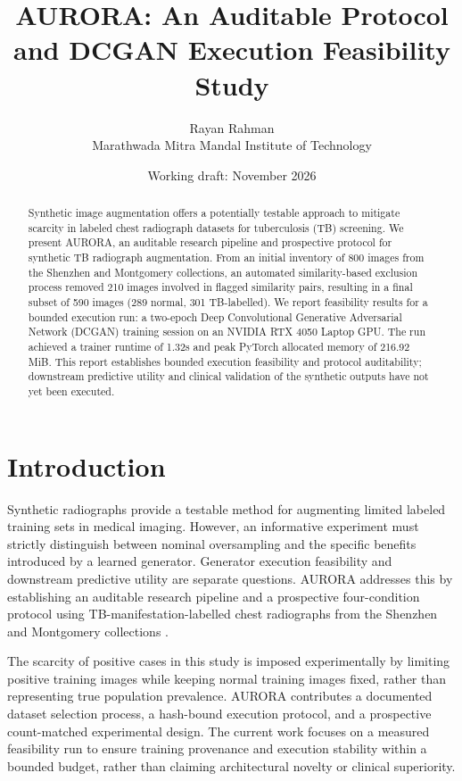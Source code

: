 \documentclass[11pt]{article}
\title{AURORA: An Auditable Protocol and DCGAN Execution Feasibility Study}
\author{Rayan Rahman\\Marathwada Mitra Mandal Institute of Technology}
\date{Working draft: November 2026}
\begin{document}
\maketitle

\begin{abstract}
Synthetic image augmentation offers a potentially testable approach to mitigate scarcity in labeled chest radiograph datasets for tuberculosis (TB) screening. We present AURORA, an auditable research pipeline and prospective protocol for synthetic TB radiograph augmentation. From an initial inventory of 800 images from the Shenzhen and Montgomery collections, an automated similarity-based exclusion process removed 210 images involved in flagged similarity pairs, resulting in a final subset of 590 images (289 normal, 301 TB-labelled). We report feasibility results for a bounded execution run: a two-epoch Deep Convolutional Generative Adversarial Network (DCGAN) training session on an NVIDIA RTX 4050 Laptop GPU. The run achieved a trainer runtime of 1.32s and peak PyTorch allocated memory of 216.92 MiB. This report establishes bounded execution feasibility and protocol auditability; downstream predictive utility and clinical validation of the synthetic outputs have not yet been executed.
\end{abstract}

\section{Introduction}
Synthetic radiographs provide a testable method for augmenting limited labeled training sets in medical imaging. However, an informative experiment must strictly distinguish between nominal oversampling and the specific benefits introduced by a learned generator. Generator execution feasibility and downstream predictive utility are separate questions. AURORA addresses this by establishing an auditable research pipeline and a prospective four-condition protocol using TB-manifestation-labelled chest radiographs from the Shenzhen and Montgomery collections \cite{jaeger2014}.

The scarcity of positive cases in this study is imposed experimentally by limiting positive training images while keeping normal training images fixed, rather than representing true population prevalence. AURORA contributes a documented dataset selection process, a hash-bound execution protocol, and a prospective count-matched experimental design. The current work focuses on a measured feasibility run to ensure training provenance and execution stability within a bounded budget, rather than claiming architectural novelty or clinical superiority.
\end{document}
